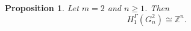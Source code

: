 \documentclass[11pt]{amsart}
\newtheorem{prop}[subsection]{Proposition}
\newtheorem{lem}[subsection]{Lemma}
\begin{document}
\begin{prop}\label{prop_h1_Gmn}
Let $m=2$ and $n\ge1$. Then
\[
H_1^\Gamma(G_n^2)\cong \mathbb{Z}^n.
\]
\end{prop}





    
\end{document}
